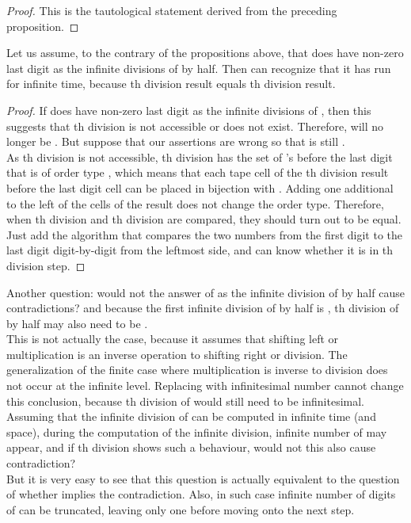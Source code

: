 \documentclass{roffin}
\begin{document}
\begin{proof}
This is the tautological statement derived from the preceding proposition.
\end{proof}
\begin{proposition}
Let us assume, to the contrary of the propositions above, that  does have non-zero last digit as the infinite divisions of  by half. Then  can recognize that it has run for infinite time, because th division result equals th division result.
\end{proposition}
\begin{proof}
If  does have non-zero last digit as the infinite divisions of , then this suggests that th division is not accessible or does not exist. Therefore,  will no longer be . But suppose that our assertions are wrong so that  is still .\\
As th division is not accessible, th division has the set of 's before the last digit that is of order type , which means that each tape cell of the th division result before the last digit cell can be placed in bijection with . Adding one additional  to the left of the cells of the result does not change the order type. Therefore, when th division and th division are compared, they should turn out to be equal.\\
Just add the algorithm that compares the two numbers from the first digit to the last digit digit-by-digit from the leftmost side, and  can know whether it is in th division step. 
\end{proof}
Another question: would not the answer of  as the infinite division of  by half cause contradictions?  and because the first infinite division of  by half is , th division of  by half may also need to be .\\
This is not actually the case, because it assumes that shifting left or multiplication is an inverse operation to shifting right or division. The generalization of the finite case where multiplication is inverse to division does not occur at the infinite level. Replacing  with infinitesimal number cannot change this conclusion, because th division of  would still need to be infinitesimal.\\
Assuming that the infinite division of  can be computed in infinite time (and space), during the computation of the infinite division, infinite number of  may appear, and if th division shows such a behaviour, would not this also cause contradiction?\\
But it is very easy to see that this question is actually equivalent to the question of whether  implies the contradiction. Also, in such case infinite number of digits of  can be truncated, leaving only one  before moving onto the next step.\\
\end{document}
